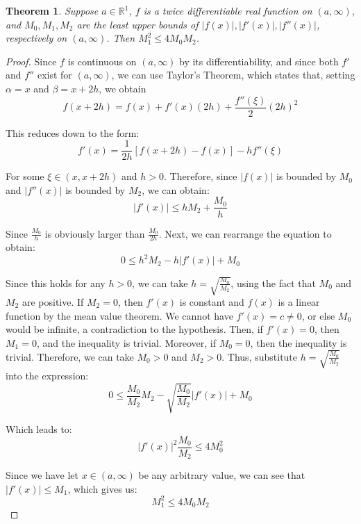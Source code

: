 \documentclass[psamsfonts]{amsart}
\newtheorem{thm}{Theorem}[section]
\theoremstyle{definition}
\theoremstyle{remark}
\numberwithin{equation}{section}
\begin{document}
\begin{thm}
Suppose $a \in \mathbb{R}^1$, $f$ is a twice differentiable real function on $(a,\infty)$, and $M_0, M_1,M_2$ are the least upper bounds of $|f(x)|,|f'(x)|,|f''(x)|$, respectively on $(a, \infty)$. Then $M_1^2 \leq 4 M_0 M_2$. 
\end{thm}

\begin{proof}
Since $f$ is continuous on $(a,\infty)$ by its differentiability, and since both $f'$ and $f''$ exist for $(a,\infty)$, we can use Taylor's Theorem, which states that, setting $\alpha = x$ and $\beta = x + 2h$, we obtain 
\begin{equation}
f(x + 2h) = f(x) + f'(x)(2h) + \frac{f''(\xi)}{2}(2h)^2
\end{equation}

This reduces down to the form:
\begin{equation}
f'(x) = \frac{1}{2h}[f(x+2h) - f(x)] - h f''(\xi)
\end{equation}

For some $\xi \in (x, x+ 2h)$ and $h > 0$. Therefore, since $|f(x)|$ is bounded by $M_0$ and $|f''(x)|$ is bounded by $M_2$, we can obtain:
\begin{equation}
|f'(x)| \leq h M_2 + \frac{M_0}{h}
\end{equation}

Since $\frac{M_0}{h}$ is obviously larger than $\frac{M_0}{2h}$. Next, we can rearrange the equation to obtain:
\begin{equation}
0 \leq h^2 M_2 - h |f'(x)| + M_0 
\end{equation}

Since this holds for any $h > 0$, we can take $h = \sqrt{\frac{M_0}{M_2}}$, using the fact that $M_0$ and $M_2$ are positive. If $M_2 = 0$, then $f'(x)$ is constant and $f(x)$ is a linear function by the mean value theorem. We cannot have $f'(x) = c \neq 0$, or else $M_0$ would be infinite, a contradiction to the hypothesis. Then, if $f'(x) = 0$, then $M_1 = 0$, and the inequality is trivial. Moreover, if $M_0 = 0$, then the inequality is trivial. Therefore, we can take $M_0 > 0$ and $M_2 >0$. Thus, substitute $h = \sqrt{\frac{M_0}{M_2}}$ into the expression:
\begin{equation}
0 \leq \frac{M_0}{M_2} M_2 - \sqrt{\frac{M_0}{M_2}}|f'(x)| + M_0 
\end{equation}

Which leads to:
\begin{equation}
|f'(x)|^2 \frac{M_0}{M_2} \leq 4M_0^2
\end{equation}

Since we have let $x \in (a, \infty)$ be any arbitrary value, we can see that $|f'(x)| \leq M_1$, which gives us:
\begin{equation}
M_1^2 \leq 4 M_0 M_2 
\end{equation}

\end{proof}
\end{document}
